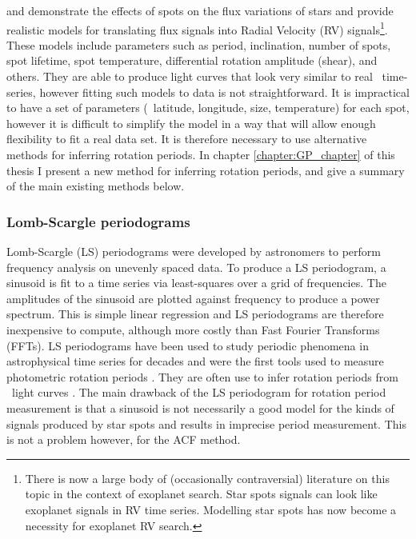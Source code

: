 \citet{Aigrain2012} and \citet{Dumusque2014} demonstrate the effects of spots
on the flux variations of stars and provide realistic models for translating
flux signals into Radial Velocity (RV) signals\footnote{There is now a large
body of (occasionally contraversial) literature on this topic in the context
of exoplanet search.
Star spots signals can look like exoplanet signals in RV time series.
Modelling star spots has now become a necessity for exoplanet RV search.}.
These models include parameters such as period, inclination, number of spots,
spot lifetime, spot temperature, differential rotation amplitude (shear), and
others.
They are able to produce light curves that look very similar to real \kepler\
time-series, however fitting such models to data is not straightforward.
It is impractical to have a set of parameters (\eg\ latitude, longitude, size,
temperature) for each spot, however it is difficult to simplify the model in a
way that will allow enough flexibility to fit a real data set.
It is therefore necessary to use alternative methods for inferring rotation
periods.
In chapter \ref{chapter:GP_chapter} of this thesis I present a new method for
inferring rotation periods, and give a summary of the main existing methods
below.

\subsubsection{Lomb-Scargle periodograms}
Lomb-Scargle (LS) periodograms \citep{Lomb1976, Scargle1982} were developed
by astronomers to perform frequency analysis on unevenly spaced data.
To produce a LS periodogram, a sinusoid is fit to a time series via
least-squares over a grid of frequencies.
The amplitudes of the sinusoid are plotted against frequency to produce a
power spectrum.
This is simple linear regression and LS periodograms are therefore
inexpensive to compute, although more costly than Fast Fourier Transforms
(FFTs).
LS periodograms have been used to study periodic phenomena in astrophysical
time series for decades and were the first tools used to measure photometric
rotation periods \citep[\eg][]{Scott1992, Mottola1995}.
They are often use to infer rotation periods from \kepler\ light curves
\citep[\eg][]{Reinhold2013, Reinhold2013b}.
The main drawback of the LS periodogram for rotation period measurement is
that a sinusoid is not necessarily a good model for the kinds of signals
produced by star spots and results in imprecise period measurement.
This is not a problem however, for the ACF method.

